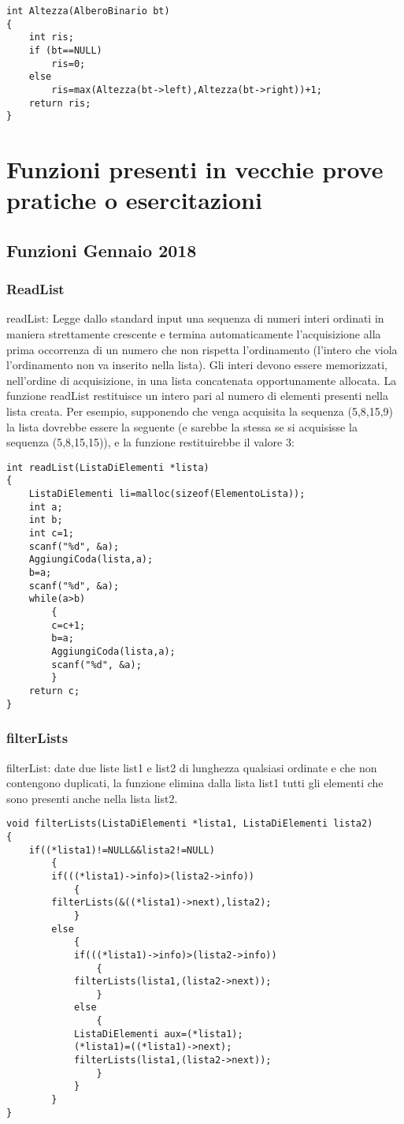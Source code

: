 \documentclass[a4paper,12pt,openany]{book}
\begin{document}
   \begin{lstlisting}
int Altezza(AlberoBinario bt)
{
    int ris;
    if (bt==NULL)
        ris=0;
    else
        ris=max(Altezza(bt->left),Altezza(bt->right))+1;
    return ris;
}
 \end{lstlisting}
 
\part{Funzioni presenti in vecchie prove pratiche o esercitazioni}
\chapter{Funzioni Gennaio 2018}
  \section{ReadList}
    readList:  Legge dallo standard input una sequenza di numeri interi
ordinati in maniera strettamente crescente e termina automaticamente l’acquisizione alla prima occorrenza di un numero che non rispetta
l’ordinamento (l’intero che viola l’ordinamento non va inserito
nella lista).   Gli  interi  devono  essere  memorizzati,  nell’ordine  di  acquisizione, in una lista concatenata opportunamente allocata.  La funzione readList restituisce un intero pari al numero di elementi presenti nella lista creata.  Per esempio, supponendo che venga acquisita la sequenza (5,8,15,9) la lista dovrebbe essere la seguente (e sarebbe la stessa se si  acquisisse  la  sequenza  (5,8,15,15)),  e  la  funzione  restituirebbe  il valore 3:
	   \begin{lstlisting}
int readList(ListaDiElementi *lista)
{
	ListaDiElementi li=malloc(sizeof(ElementoLista));
	int a;
	int b;
	int c=1;
	scanf("%d", &a);
	AggiungiCoda(lista,a);
	b=a;
	scanf("%d", &a);
	while(a>b)
		{
		c=c+1;
		b=a;
		AggiungiCoda(lista,a);
		scanf("%d", &a);
		}
	return c;
}
	\end{lstlisting}
  \section{filterLists}
  filterList: date due liste list1 e list2 di lunghezza qualsiasi ordinate e che non contengono duplicati, la funzione elimina dalla lista list1 tutti gli elementi che sono presenti anche nella lista list2.
	   \begin{lstlisting}
void filterLists(ListaDiElementi *lista1, ListaDiElementi lista2)
{
	if((*lista1)!=NULL&&lista2!=NULL)
		{
		if(((*lista1)->info)>(lista2->info))
			{
		filterLists(&((*lista1)->next),lista2);
			}
		else
			{
			if(((*lista1)->info)>(lista2->info))
				{
			filterLists(lista1,(lista2->next));
				}
			else
				{
			ListaDiElementi aux=(*lista1);
			(*lista1)=((*lista1)->next);
			filterLists(lista1,(lista2->next));
				}
			}
		}
}
		\end{lstlisting}
\end{document}
